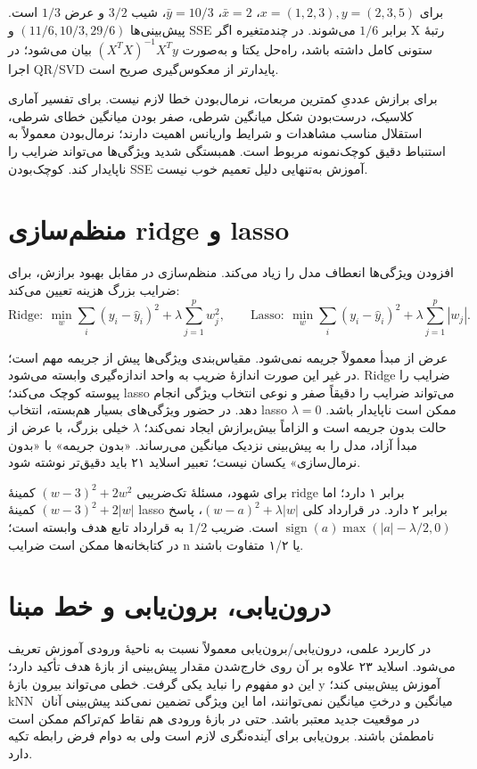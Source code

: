 برای \(x=(1,2,3),y=(2,3,5)\)، \(\bar x=2\)، \(\bar y=10/3\)، شیب \(3/2\) و عرض \(1/3\) است. پیش‌بینی‌ها \((11/6,10/3,29/6)\) و SSE برابر \(1/6\) می‌شوند. در چندمتغیره اگر X رتبهٔ ستونی کامل داشته باشد، راه‌حل یکتا و به‌صورت \((X^TX)^{-1}X^Ty\) بیان می‌شود؛ در اجرا QR/SVD پایدارتر از معکوس‌گیری صریح است.

برای برازش عددیِ کمترین مربعات، نرمال‌بودن خطا لازم نیست. برای تفسیر آماری کلاسیک، درست‌بودن شکل میانگین شرطی، صفر بودن میانگین خطای شرطی، استقلال مناسب مشاهدات و شرایط واریانس اهمیت دارند؛ نرمال‌بودن معمولاً به استنباط دقیق کوچک‌نمونه مربوط است. همبستگی شدید ویژگی‌ها می‌تواند ضرایب را ناپایدار کند. کوچک‌بودن SSE آموزش به‌تنهایی دلیل تعمیم خوب نیست.

\section{منظم‌سازی ridge و lasso}

افزودن ویژگی‌ها انعطاف مدل را زیاد می‌کند. منظم‌سازی در مقابل بهبود برازش، برای ضرایب بزرگ هزینه تعیین می‌کند: \[
\text{Ridge}:\ \min_w \sum_i(y_i-\widehat y_i)^2+\lambda\sum_{j=1}^p w_j^2,
\qquad
\text{Lasso}:\ \min_w \sum_i(y_i-\widehat y_i)^2+\lambda\sum_{j=1}^p|w_j|.
\]

عرض از مبدأ معمولاً جریمه نمی‌شود. مقیاس‌بندی ویژگی‌ها پیش از جریمه مهم است؛ در غیر این صورت اندازهٔ ضریب به واحد اندازه‌گیری وابسته می‌شود. Ridge ضرایب را پیوسته کوچک می‌کند؛ lasso می‌تواند ضرایب را دقیقاً صفر و نوعی انتخاب ویژگی انجام دهد. در حضور ویژگی‌های بسیار هم‌بسته، انتخاب lasso ممکن است ناپایدار باشد. \(\lambda=0\) حالت بدون جریمه است و الزاماً بیش‌برازش ایجاد نمی‌کند؛ \(\lambda\) خیلی بزرگ، با عرض از مبدأ آزاد، مدل را به پیش‌بینی نزدیک میانگین می‌رساند. «بدون جریمه» با «بدون نرمال‌سازی» یکسان نیست؛ تعبیر اسلاید ۲۱ باید دقیق‌تر نوشته شود.

برای شهود، مسئلهٔ تک‌ضریبی \((w-3)^2+2w^2\) کمینهٔ ridge برابر ۱ دارد؛ اما \((w-3)^2+2|w|\) کمینهٔ lasso برابر ۲ دارد. در قرارداد کلی \((w-a)^2+\lambda|w|\)، پاسخ \(\operatorname{sign}(a)\max(|a|-\lambda/2,0)\) است. ضریب \(1/2\) به قرارداد تابع هدف وابسته است؛ در کتابخانه‌ها ممکن است ضرایب n یا ۱/۲ متفاوت باشند.

\section{درون‌یابی، برون‌یابی و خط مبنا}

در کاربرد علمی، درون‌یابی/برون‌یابی معمولاً نسبت به ناحیهٔ ورودی آموزش تعریف می‌شود. اسلاید ۲۳ علاوه بر آن روی خارج‌شدن مقدار پیش‌بینی از بازهٔ هدف تأکید دارد؛ این دو مفهوم را نباید یکی گرفت. خطی می‌تواند بیرون بازهٔ y آموزش پیش‌بینی کند؛ kNN ِ میانگین و درختِ میانگین نمی‌توانند، اما این ویژگی تضمین نمی‌کند پیش‌بینی آنان در موقعیت جدید معتبر باشد. حتی در بازهٔ ورودی هم نقاط کم‌تراکم ممکن است نامطمئن باشند. برون‌یابی برای آینده‌نگری لازم است ولی به دوام فرض رابطه تکیه دارد.

